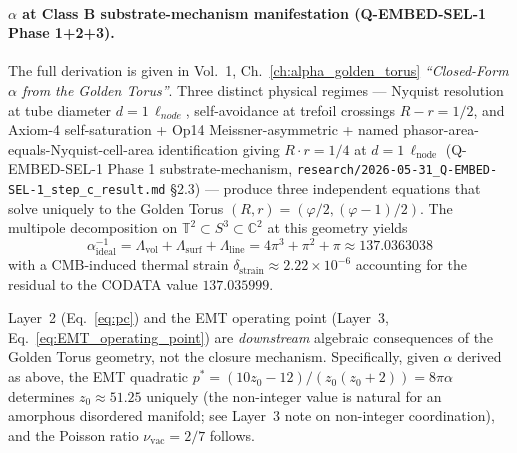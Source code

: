 \paragraph{$\alpha$ at Class B substrate-mechanism manifestation (Q-EMBED-SEL-1 Phase 1+2+3).}
The full derivation is given in Vol.~1, Ch.~\ref{ch:alpha_golden_torus}
\textit{``Closed-Form $\alpha$ from the Golden Torus''}. Three distinct physical regimes --- Nyquist resolution at tube
diameter $d = 1\,\ell_{node}$, self-avoidance at trefoil crossings
$R - r = 1/2$, and Axiom-4 self-saturation + Op14 Meissner-asymmetric +
named phasor-area-equals-Nyquist-cell-area identification giving
$R \cdot r = 1/4$ at $d = 1\,\ell_\text{node}$ (Q-EMBED-SEL-1 Phase 1 substrate-mechanism,
\texttt{research/2026-05-31\_Q-EMBED-SEL-1\_step\_c\_result.md} \S2.3) ---
produce three independent equations that solve uniquely to the Golden Torus
$(R, r) = (\varphi/2, (\varphi-1)/2)$. The multipole
decomposition on $\mathbb{T}^2 \subset S^3 \subset \mathbb{C}^2$ at this geometry yields
\begin{equation}
    \alpha^{-1}_{\text{ideal}} = \Lambda_{\text{vol}} + \Lambda_{\text{surf}} + \Lambda_{\text{line}} = 4\pi^3 + \pi^2 + \pi \approx 137.0363038
\end{equation}
with a CMB-induced thermal strain $\delta_{\text{strain}} \approx 2.22 \times 10^{-6}$ accounting for the residual to the CODATA value $137.035999$.

Layer~2 (Eq.~\ref{eq:pc}) and the EMT operating point (Layer~3,
Eq.~\ref{eq:EMT_operating_point}) are \textit{downstream} algebraic
consequences of the Golden Torus geometry, not the closure mechanism.
Specifically, given $\alpha$ derived as above, the EMT quadratic
$p^* = (10z_0 - 12)/(z_0(z_0+2)) = 8\pi\alpha$ determines $z_0 \approx 51.25$
uniquely (the non-integer value is natural for an amorphous disordered manifold;
see Layer~3 note on non-integer coordination), and the Poisson ratio
$\nu_{\text{vac}} = 2/7$ follows.

